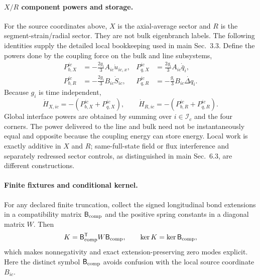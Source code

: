 \documentclass[10pt,aps,onecolumn,notitlepage,nofootinbib]{revtex4-2}
\begin{document}
\paragraph*{$X/R$ component powers and storage.}
For the source coordinates above, $X$ is the axial-average sector and $R$ is the segment-strain/radial sector. They are not bulk eigenbranch labels. The following identities supply the detailed local bookkeeping used in main Sec.~3.3. Define the powers done by the coupling force on the bulk and line subsystems,
\begin{align}
  P_{b,X}^{ic}&=-\frac{2g_i}{3}A_{ic}\dot u_{ic,x},
  &P_{q,X}^{ic}&=\frac{2g_i}{3}A_{ic}\dot{\bar q}_i,
  \label{eq:sm-X-powers}\\
  P_{b,R}^{ic}&=-\frac{2g_i}{3}B_{ic}\dot S_{ic},
  &P_{q,R}^{ic}&=-\frac{g_i}{3}B_{ic}\dot{\Delta q}_i.
  \label{eq:sm-R-powers}
\end{align}
Because $g_i$ is time independent,
\begin{equation}
  \dot H_{X,ic}=-(P_{b,X}^{ic}+P_{q,X}^{ic}),
  \qquad
  \dot H_{R,ic}=-(P_{b,R}^{ic}+P_{q,R}^{ic}).
  \label{eq:sm-local-work}
\end{equation}
Global interface powers are obtained by summing over $i\in\mathcal I_c$ and the four corners. The power delivered to the line and bulk need not be instantaneously equal and opposite because the coupling energy can store energy. Local work is exactly additive in $X$ and $R$; same-full-state field or flux interference and separately redressed sector controls, as distinguished in main Sec.~6.3, are different constructions.

\paragraph*{Finite fixtures and conditional kernel.}
For any declared finite truncation, collect the signed longitudinal bond extensions in a compatibility matrix $\mathsf B_{\rm comp}$ and the positive spring constants in a diagonal matrix $W$. Then
\begin{equation}
 K=\mathsf B_{\rm comp}^{\mathsf T}W\mathsf B_{\rm comp},
 \qquad
 \ker K=\ker\mathsf B_{\rm comp},
\end{equation}
which makes nonnegativity and exact extension-preserving zero modes explicit. Here the distinct symbol $\mathsf B_{\rm comp}$ avoids confusion with the local source coordinate $B_{ic}$.
\end{document}
